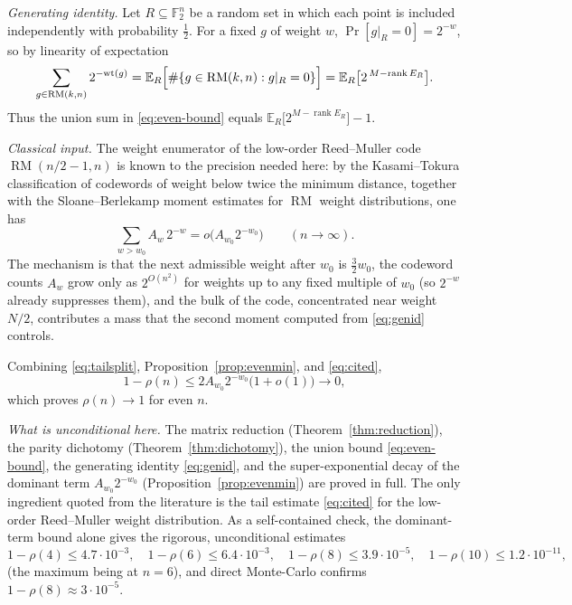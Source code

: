 \documentclass{amsart}
\theoremstyle{definition}
\DeclareMathOperator{\RM}{RM}
\DeclareMathOperator{\rank}{rank}
\newcommand{\F}{\mathbb{F}}
\begin{document}
\emph{Generating identity.} Let $R\subseteq\F_2^n$ be a random set in which
each point is included independently with probability $\tfrac12$. For a
fixed $g$ of weight $w$, $\Pr[g|_R=0]=2^{-w}$, so by linearity of
expectation
\begin{equation}\label{eq:genid}
\sum_{g\in\RM(k,n)}2^{-\mathrm{wt}(g)}
=\mathbb E_R\Bigl[\#\{g\in\RM(k,n):g|_R=0\}\Bigr]
=\mathbb E_R\bigl[2^{\,M-\rank E_R}\bigr].
\end{equation}
Thus the union sum in \eqref{eq:even-bound} equals
$\mathbb E_R\bigl[2^{M-\rank E_R}\bigr]-1$.

\emph{Classical input.} The weight enumerator of the low-order Reed--Muller
code $\RM(n/2-1,n)$ is known to the precision needed here: by the
Kasami--Tokura classification of codewords of weight below twice the
minimum distance, together with the Sloane--Berlekamp moment estimates for
$\RM$ weight distributions, one has
\begin{equation}\label{eq:cited}
\sum_{w>w_0}A_w\,2^{-w}=o\bigl(A_{w_0}2^{-w_0}\bigr)\qquad(n\to\infty).
\end{equation}
The mechanism is that the next admissible weight after $w_0$ is
$\tfrac32 w_0$, the codeword counts $A_w$ grow only as $2^{O(n^2)}$ for
weights up to any fixed multiple of $w_0$ (so $2^{-w}$ already suppresses
them), and the bulk of the code, concentrated near weight $N/2$, contributes
a mass that the second moment computed from \eqref{eq:genid} controls.

Combining \eqref{eq:tailsplit}, Proposition~\ref{prop:evenmin}, and
\eqref{eq:cited},
\[
1-\rho(n)\le 2A_{w_0}2^{-w_0}\bigl(1+o(1)\bigr)\longrightarrow 0,
\]
which proves $\rho(n)\to1$ for even $n$.

\emph{What is unconditional here.} The matrix reduction
(Theorem~\ref{thm:reduction}), the parity dichotomy
(Theorem~\ref{thm:dichotomy}), the union bound \eqref{eq:even-bound}, the
generating identity \eqref{eq:genid}, and the super-exponential decay of the
dominant term $A_{w_0}2^{-w_0}$ (Proposition~\ref{prop:evenmin}) are proved
in full. The only ingredient quoted from the literature is the tail
estimate \eqref{eq:cited} for the low-order Reed--Muller weight
distribution. As a self-contained check, the dominant-term bound alone
gives the rigorous, unconditional estimates
\[
1-\rho(4)\le 4.7\cdot10^{-3},\quad 1-\rho(6)\le 6.4\cdot10^{-3},\quad
1-\rho(8)\le 3.9\cdot10^{-5},\quad 1-\rho(10)\le 1.2\cdot10^{-11},
\]
(the maximum being at $n=6$), and direct Monte-Carlo confirms
$1-\rho(8)\approx3\cdot10^{-5}$.
\end{document}

